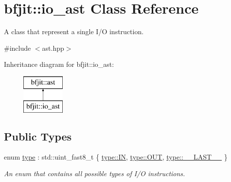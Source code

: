 \hypertarget{classbfjit_1_1io__ast}{}\section{bfjit\+:\+:io\+\_\+ast Class Reference}
\label{classbfjit_1_1io__ast}


A class that represent a single I/O instruction.  




{\ttfamily \#include $<$ast.\+hpp$>$}

Inheritance diagram for bfjit\+:\+:io\+\_\+ast\+:\begin{figure}[H]
\begin{center}
\leavevmode
\includegraphics[height=2.000000cm]{classbfjit_1_1io__ast}
\end{center}
\end{figure}
\subsection*{Public Types}
\begin{DoxyCompactItemize}
\item 
enum \hyperlink{classbfjit_1_1io__ast_ae0b93ddde6f86aed45dd22b72d290414}{type} \+: std\+::uint\+\_\+fast8\+\_\+t \{ \hyperlink{classbfjit_1_1io__ast_ae0b93ddde6f86aed45dd22b72d290414ac86ee0d9d7ed3e7b4fdbf486fa6c0ebb}{type\+::\+IN}, 
\hyperlink{classbfjit_1_1io__ast_ae0b93ddde6f86aed45dd22b72d290414aef373774188a51f80463f37b6bd9e83a}{type\+::\+O\+UT}, 
\hyperlink{classbfjit_1_1io__ast_ae0b93ddde6f86aed45dd22b72d290414a62bd5a4afef994ba01e631cbf00f85be}{type\+::\+\_\+\+\_\+\+L\+A\+S\+T\+\_\+\+\_\+}
 \}\begin{DoxyCompactList}\small\item\em An enum that contains all possible types of I/O instructions. \end{DoxyCompactList}
\end{DoxyCompactItemize}
